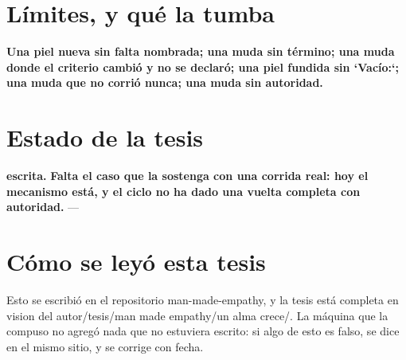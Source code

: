 \documentclass[11pt,a4paper]{article}
\begin{document}
\section{Límites, y qué la tumba}
\textbf{Una piel nueva sin falta nombrada; una muda sin término; una muda donde el criterio cambió y no se declaró; una piel fundida sin `Vacío:`; una muda que no corrió nunca; una muda sin autoridad.}

\section{Estado de la tesis}
\textbf{escrita.} \textbf{Falta el caso que la sostenga con una corrida real: hoy el mecanismo está, y el ciclo no ha dado una vuelta completa con autoridad.} ---

\section*{Cómo se leyó esta tesis}
Esto se escribió en el repositorio man-made-empathy, y la tesis está completa en vision del autor/tesis/man made empathy/un alma crece/. La máquina que la compuso no agregó nada que no estuviera escrito: si algo de esto es falso, se dice en el mismo sitio, y se corrige con fecha.
\end{document}

